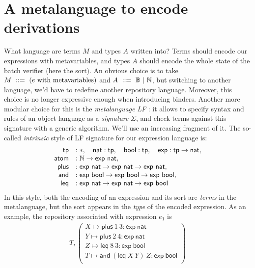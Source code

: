 \documentclass[9pt]{sigplanconf}
\begin{document}
\section{A metalanguage to encode derivations}

What language are terms $M$ and types $A$ written into? Terms should
encode our expressions with metavariables, and types $A$ should encode
the whole state of the batch verifier (here the sort). An obvious
choice is to take $M\ ::=\ (e \text{ with metavariables})$ and
$A\ ::=\  \mathbb B\ |\ \mathbb N$, but switching to another language, we'd have
to redefine another repository language. Moreover, this choice is no
longer expressive enough when introducing binders. Another more
modular choice for this is the \emph{metalanguage} \emph{LF}
\cite{harper1993framework}: it allows to specify syntax and rules of
an object language as a \emph{signature} $\Sigma$, and check terms
against this signature with a generic algorithm. We'll use an
increasing fragment of it. The so-called \emph{intrinsic} style of LF
signature for our expression language is:
$$
\begin{array}{rl}
  \mathsf{tp} &: \type,\quad
  \mathsf{nat} : \mathsf{tp},\quad
  \mathsf{bool} : \mathsf{tp},\quad
  \mathsf{exp} : \mathsf{tp}\to \mathsf{nat},\\
  \mathsf{atom} &: \nat\to \mathsf{exp}\ \mathsf{nat},\\
  \mathsf{plus} &: \mathsf{exp}\ \mathsf{nat} \to \mathsf{exp}\ \mathsf{nat} \to \mathsf{exp}\ \mathsf{nat},\\
  \mathsf{and} &: \mathsf{exp}\ \mathsf{bool}\to \mathsf{exp}\ \mathsf{bool}\to \mathsf{exp}\ \mathsf{bool},\\
  \mathsf{leq} &: \mathsf{exp}\ \mathsf{nat}\to \mathsf{exp}\ \mathsf{nat}\to \mathsf{exp}\ \mathsf{bool}
\end{array}
$$
In this style, both the encoding of an expression and its sort are
\emph{terms} in the metalanguage, but the sort appears in the
\emph{type} of the encoded expression. As an example, the repository
associated with expression $e_1$ is
\begin{align*}
  T, \left(
  \begin{array}{l}
  X \mapsto \mathsf{plus}\ 1\ 3 : \mathsf{exp}\ \mathsf{nat} \\
  Y \mapsto \mathsf{plus}\ 2\ 4 : \mathsf{exp}\ \mathsf{nat} \\
  Z \mapsto \mathsf{leq}\ 8\ 3 : \mathsf{exp}\ \mathsf{bool} \\
  T \mapsto \mathsf{and}\ (\mathsf{leq}\ X\ Y)\ Z : \mathsf{exp}\ \mathsf{bool} \\
\end{array}\right)
\end{align*}
\end{document}
